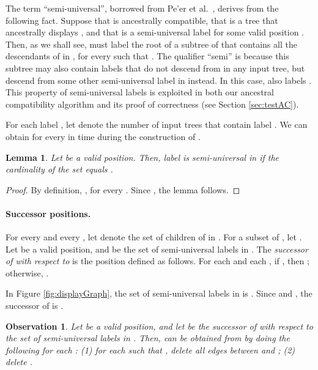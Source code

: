 \documentclass[11pt]{article}
\newtheorem{lemma}{Lemma}
\newtheorem{observation}{Observation}
\theoremstyle{definition}
\begin{document}
The term ``semi-universal'', borrowed from Pe'er et al.\ \cite{PeerShamirSharan04}, derives from the following fact.
Suppose that  is ancestrally compatible, that  is a tree that ancestrally displays , and that  is a semi-universal label for some valid position .  Then, as we shall see,  must label the root  of a subtree of  that contains all the descendants of  in , for every  such that .  The qualifier ``semi'' is because this subtree may also contain labels that do not descend from  in any input tree, but descend from some other semi-universal label  in  instead. In this case,  also labels .  This property of semi-universal labels is exploited in both our ancestral compatibility algorithm and its proof of correctness (see Section \ref{sec:testAC}).

For each label , let  denote the number of input trees that contain label .  We can obtain  for every  in  time during the construction of .   

\begin{lemma}\label{lem:semiU}
Let  be a valid position.  Then, label  is semi-universal in  if the cardinality of the set  equals .
\end{lemma}
\begin{proof}
By definition, , for every . Since , the lemma follows.
\end{proof}

\vspace{-1.5\parsep}

\paragraph{Successor positions.} 
For every  and every , let  denote the set of children of  in .  For a subset  of , let .  
Let  be a valid position, and  be the set of semi-universal labels in .  The \emph{successor of  with respect to } is the position  defined as follows.  For each  and each , if , then ; otherwise, .  

In Figure \ref{fig:displayGraph}, the set of semi-universal labels in  is .  Since  and , the successor of  is .

\begin{observation}\label{obs:update2}
Let  be a valid position, and let  be the successor of  with respect to the set  of semi-universal labels in .  Then,  can be obtained from  by doing the following for each : (1) for each  such that , delete all edges between  and ; (2) delete .
\end{observation}
\end{document}
